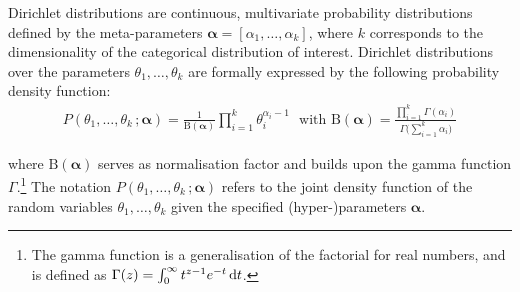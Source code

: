 Dirichlet distributions are continuous, multivariate probability distributions defined by the meta-parameters $\boldsymbol\alpha = [\alpha_1, \dots, \alpha_k]$, where $k$ corresponds to the dimensionality of the categorical distribution of interest.  Dirichlet distributions over the parameters $\theta_1, \dots, \theta_k$ are formally expressed by the following probability density function:
\begin{align}
P(\theta_1, \dots, \theta_k\,; \boldsymbol\alpha) = \frac{1}{\mathrm{B}(\boldsymbol\alpha)} \prod_{i=1}^k \theta_i^{\alpha_i - 1} \ \ \ \text{with } \mathrm{B}(\boldsymbol\alpha) = \frac{\prod_{i=1}^k \Gamma(\alpha_i)}{\Gamma\bigl(\sum_{i=1}^k \alpha_i\bigr)}
\end{align}

where $ \mathrm{B}(\boldsymbol\alpha)$ serves as normalisation factor and builds upon the gamma function $\Gamma$.\footnote{The gamma function is a generalisation of the factorial for real numbers, and is defined as $\Gamma(z) = \int_0^\infty  t^{z-1} e^{-t}\,{\rm d}t$.} The notation $P(\theta_1, \dots, \theta_k\,; \boldsymbol\alpha)$ refers to the joint density function of the random variables $\theta_1, \dots, \theta_k$ given the specified (hyper-)parameters $\boldsymbol\alpha$. 

